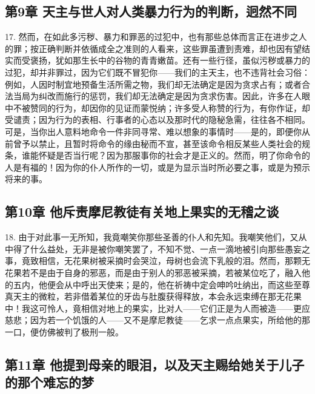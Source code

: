 \subsection{第9章 天主与世人对人类暴力行为的判断，迥然不同}

17. 然而，在如此多污秽、暴力和罪恶的过犯中，也有那些总体而言正在进步之人的罪；按正确判断并依循成全之准则的人看来，这些罪虽遭到责难，却也因有望结实而受褒扬，犹如那生长中的谷物的青青嫩苗。还有一些行径，虽似污秽或暴力的过犯，却并非罪过，因为它们既不冒犯你——我们的主天主，也不违背社会习俗：例如，人因时制宜地预备生活所需之物，我们却无法确定是因为贪求占有；或者合法当局为纠改而施行的惩罚，我们却无法确定是因为贪求伤害。因此，许多在人眼中不被赞同的行为，却因你的见证而蒙悦纳；许多受人称赞的行为，有你作证，却受谴责；因为行为的表相、行事者的心态以及那时代的隐秘急需，往往各不相同。可是，当你出人意料地命令一件非同寻常、难以想象的事情时——是的，即便你从前曾予以禁止，且暂时将命令的缘由秘而不宣，甚至该命令相反某些人类社会的规条，谁能怀疑是否当行呢？因为那服事你的社会才是正义的。然而，明了你命令的人是有福的！因为你的仆人所作的一切，或是为显示当时所必要之事，或是为预示将来的事。\par


\subsection{第10章 他斥责摩尼教徒有关地上果实的无稽之谈}

18. 由于对此事一无所知，我竟嘲笑你那些圣善的仆人和先知。我嘲笑他们，又从中得了什么益处，无非是被你嘲笑罢了，不知不觉、一点一滴地被引向那些愚妄之事，竟致相信，无花果树被采摘时会哭泣，母树也会流下乳般的泪。然而，那颗无花果若不是由于自身的邪恶，而是由于别人的邪恶被采摘，若被某位吃了，融入他的五内，他便会从中呼出天使来；是的，他在祈祷中定会呻吟吐纳出，而这些至尊真天主的微粒，若非借着某位的牙齿与肚腹获得释放，本会永远束缚在那无花果中！我这可怜人，竟相信对地上的果实，比对人——它们正是为人而被造——更应慈悲；因为若一个饥饿的人——又不是摩尼教徒——乞求一点点果实，所给他的那一口，便仿佛被判了极刑一般。\par


\subsection{第11章 他提到母亲的眼泪，以及天主赐给她关于儿子的那个难忘的梦}


